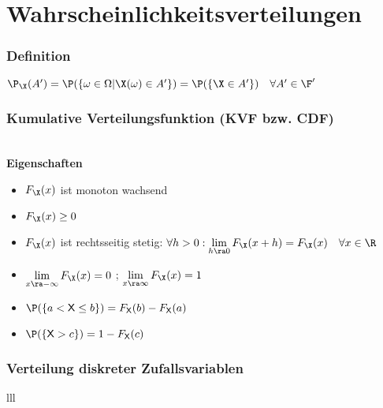 \documentclass[german,color,6pt]{latex4ei/latex4ei_sheet}
\begin{document}
\section{Wahrscheinlichkeitsverteilungen}
\vspace{-0.1cm}
\begin{sectionbox}
\vspace{-0.05cm}
	\subsubsection{Definition}
	$\P_{\X}(A') = \P(\{\omega \in \Omega|\X(\omega) \in A'\}) = \P(\{\X \in A'\}) \quad \forall A' \in \F'$

	\subsubsection{Kumulative Verteilungsfunktion (KVF bzw. CDF)}
	 \\
	\textbf{Eigenschaften}
	\begin{itemize}\itemsep1pt
		\item $F_{\X}(x)$ ist monoton wachsend
		\item $F_{\X}(x) \geq 0$
		\item $F_{\X}(x)$ ist rechtsseitig stetig: \newline
		$\forall h > 0: \lim\limits_{h\ra0}F_{\X}(x + h) = F_{\X}(x) \quad \forall x \in \R$
		\item $\lim\limits_{x\ra-\infty}F_{\X}(x) = 0$ ; $\lim\limits_{x\ra\infty}F_{\X}(x) = 1$
		\item  $\P(\{a < \mathsf{X} \leq b \}) = F_\mathsf{X}(b) - F_\mathsf{X}(a)$
		\item  $\P(\{\mathsf{X} > c \}) = 1 - F_\mathsf{X}(c)$
	\end{itemize}

	\subsubsection{Verteilung diskreter Zufallsvariablen}


	\begin{tablebox}{lll}


\end{tablebox}
\end{sectionbox}
\end{document}
